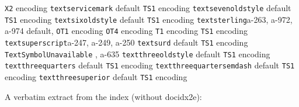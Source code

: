 \documentclass[twoside]{ltxdoc}
\makeatletter
\renewenvironment{theindex}{%
   \@restonecoltrue
   \if@twocolumn\@restonecolfalse\fi
   \columnseprule \z@
   \columnsep 35\p@
   \twocolumn[\index@prologue]%
   \IndexParms
   \let\item\@idxitem
   \ignorespaces
}{\if@restonecol\onecolumn\else\clearpage\fi}
\makeatother
\begin{document}
\begin{theindex}
    \subitem \texttt  {X2} encoding\pfill {}
  \item \texttt  {textservicemark}\efill 
    \subitem default\pfill {}
    \subitem \texttt  {TS1} encoding\pfill {}
  \item \texttt  {textsevenoldstyle}\efill 
    \subitem default\pfill {}
    \subitem \texttt  {TS1} encoding\pfill {}
  \item \texttt  {textsixoldstyle}\efill 
    \subitem default\pfill {}
    \subitem \texttt  {TS1} encoding\pfill {}
  \item \texttt  {textsterling}\pfill a-263, a-972, 
                a-974
    \subitem default\pfill {}, 
    \subitem \texttt  {OT1} encoding\pfill {}
    \subitem \texttt  {OT4} encoding\pfill {}
    \subitem \texttt  {T1} encoding\pfill {}
    \subitem \texttt  {TS1} encoding\pfill {}
  \item \texttt  {textsuperscript}\pfill a-247, 
                a-249, a-250
  \item \texttt  {textsurd}\efill 
    \subitem default\pfill {}
    \subitem \texttt  {TS1} encoding\pfill {}
  \item \texttt  {TextSymbolUnavailable}\pfill 
                , a-635
  \item \texttt  {textthreeoldstyle}\efill 
    \subitem default\pfill {}
    \subitem \texttt  {TS1} encoding\pfill {}
  \item \texttt  {textthreequarters}\efill 
    \subitem default\pfill {}
    \subitem \texttt  {TS1} encoding\pfill {}
  \item \texttt  {textthreequartersemdash}\efill 
    \subitem default\pfill {}
    \subitem \texttt  {TS1} encoding\pfill {}
  \item \texttt  {textthreesuperior}\efill 
    \subitem default\pfill {}
    \subitem \texttt  {TS1} encoding\pfill {}
  \begin{figure*}[tp]
    A verbatim extract from the index (without \textsf{docidx2e}):
    

\end{figure*}
\end{theindex}
\end{document}
